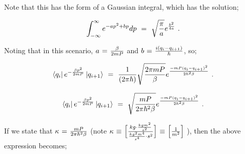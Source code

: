 \documentclass[11pt]{article}
\begin{document}
Note that this has the form of a Gaussian integral, which has the solution; 

\begin{equation} \label{wr-eq-24-1}
\int_{- \infty}^{\infty} e^{{ -a p^2 + b p}} dp \hspace{0.125cm} = \hspace{0.125cm} \sqrt{\frac{\pi}{a}} e^{{\frac{b^2}{4 a}}} \hspace{0.125cm} .
\end{equation}

Noting that in this scenario, \begin{math} a \hspace{0.025cm} = \hspace{0.025cm} \frac{\beta}{2 m P} \end{math} and \begin{math} b \hspace{0.025cm} = \hspace{0.025cm} \frac{i (q_i - q_{i + 1})}{\hbar} \end{math}, so;

\begin{equation} \label{wr-eq-25-1}
\bra{q_i} e^{ - \frac{ \beta p^2}{2 m P}} \ket{q_{i+1}} \hspace{0.125cm} = \hspace{0.125cm} \frac{1}{(2 \pi \hbar)} \sqrt{\frac{2 \pi m P}{\beta}}   e^{ \frac{ - m P (q_i - q_{i+1})^2}{2 \hbar^2 \beta}}  \hspace{0.125cm} .
\end{equation}

\begin{equation} \label{wr-eq-26-1}
\bra{q_i} e^{ - \frac{ \beta p^2}{2 m P}} \ket{q_{i+1}} \hspace{0.125cm} = \hspace{0.125cm} \sqrt{\frac{m P}{2 \pi \hbar^2 \beta}} e^{ \frac{ - m P (q_i - q_{i+1})^2}{2 \hbar^2 \beta}} \hspace{0.125cm} .
\end{equation}

If we state that \begin{math} \kappa \hspace{0.025cm} = \hspace{0.025cm} \frac{m P}{2 \pi \hbar^2 \beta} \end{math} (note \begin{math} \kappa \hspace{0.025cm} \equiv \hspace{0.025cm} \Big[ \frac{kg \cdot \frac{kg m^2}{s^2}}{\frac{kg^2 m^4}{s^4} \cdot s^2}  \Big] \hspace{0.025cm} \equiv \hspace{0.025cm} \Big[ \frac{1}{m^2} \Big]  \end{math} ), then the above expression becomes;
\end{document}
